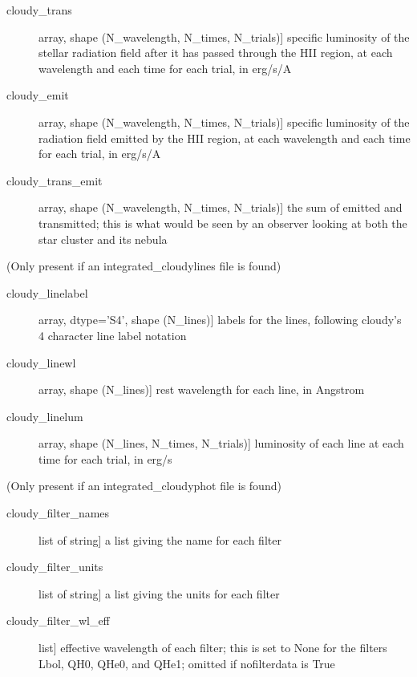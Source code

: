 \documentclass[letterpaper,10pt,english]{sphinxmanual}
\begin{document}
\begin{fulllineitems}
\begin{description}
\begin{description}
\item[{cloudy\_trans}] \leavevmode{[}array, shape (N\_wavelength, N\_times, N\_trials){]}
specific luminosity of the stellar radiation field after it has
passed through the HII region, at each wavelength and each time
for each trial, in erg/s/A

\item[{cloudy\_emit}] \leavevmode{[}array, shape (N\_wavelength, N\_times, N\_trials){]}
specific luminosity of the radiation field emitted by the HII
region, at each wavelength and each time for each trial, in
erg/s/A

\item[{cloudy\_trans\_emit}] \leavevmode{[}array, shape (N\_wavelength, N\_times, N\_trials){]}
the sum of emitted and transmitted; this is what would be seen
by an observer looking at both the star cluster and its nebula

\end{description}

(Only present if an integrated\_cloudylines file is found)
\begin{description}
\item[{cloudy\_linelabel}] \leavevmode{[}array, dtype='S4', shape (N\_lines){]}
labels for the lines, following cloudy's 4 character line label
notation

\item[{cloudy\_linewl}] \leavevmode{[}array, shape (N\_lines){]}
rest wavelength for each line, in Angstrom

\item[{cloudy\_linelum}] \leavevmode{[}array, shape (N\_lines, N\_times, N\_trials){]}
luminosity of each line at each time for each trial, in erg/s

\end{description}

(Only present if an integrated\_cloudyphot file is found)
\begin{description}
\item[{cloudy\_filter\_names}] \leavevmode{[}list of string{]}
a list giving the name for each filter

\item[{cloudy\_filter\_units}] \leavevmode{[}list of string{]}
a list giving the units for each filter

\item[{cloudy\_filter\_wl\_eff}] \leavevmode{[}list{]}
effective wavelength of each filter; this is set to None for the
filters Lbol, QH0, QHe0, and QHe1; omitted if nofilterdata is
True


\end{description}
\end{description}
\end{fulllineitems}
\end{document}
